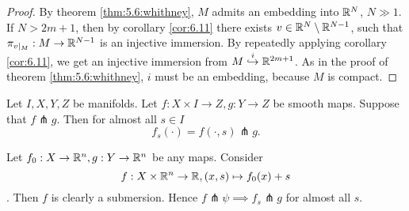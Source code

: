 \begin{proof}
    By theorem \ref{thm:5.6:whithney}, \(M\) admits an embedding into \(\mathbb{R}^N\), \(N\gg1\). If \(N>2m+1\),
    then by corollary \ref{cor:6.11} there exists \(v\in\mathbb{R}^N\setminus\mathbb{R}^{N-1}\), such that \(\pi_{v\mid_M}:M\to\mathbb{R}^{N-1}\)
    is an injective immersion. By repeatedly applying corollary \ref{cor:6.11}, we get an 
    injective immersion from \(M\stackrel{i}{\hookrightarrow} \mathbb{R}^{2m+1}\). As in the proof of theorem \ref{thm:5.6:whithney},
    \(i\) must be an embedding, because \(M\) is compact.
\end{proof}

\begin{corollary}\label{cor:6.13} Let \(I,X,Y,Z\) be manifolds. Let \(f:X\times I\to Z,g:Y\to Z\)
    be smooth maps. Suppose that \(f\pitchfork g\). Then for almost all \(s\in I\)
    \[f_s(\cdot)=f(\cdot,s)\pitchfork g.\] 
\end{corollary}

\begin{remark}
    Let \(f_0:X\to \mathbb{R}^n,g:Y\to\mathbb{R}^n\) be any maps. Consider \[f:X\times \mathbb{R}^n\to\mathbb{R},(x,s)\mapsto f_0(x)+s\].
    Then \(f\) is clearly a submersion. Hence \(f\pitchfork\psi\implies f_s\pitchfork g\) for almost all \(s\).
\end{remark}

